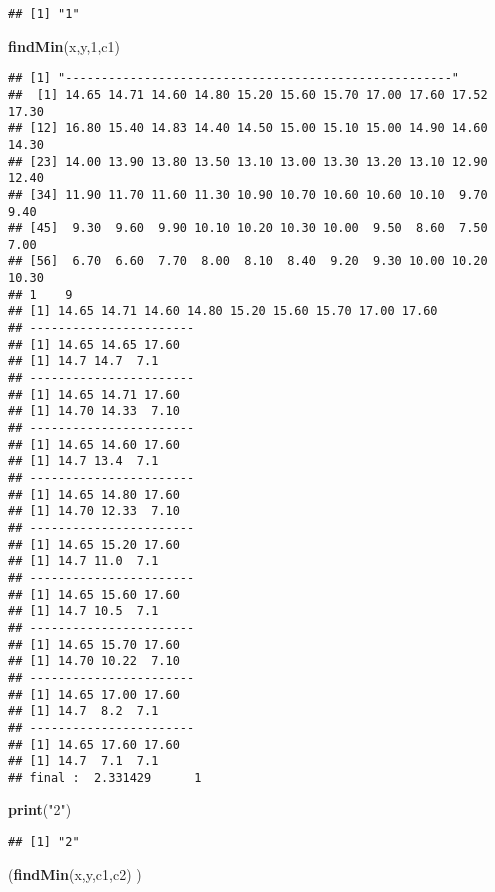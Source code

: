 \documentclass[]{article}
\newenvironment{Shaded}{\begin{snugshade}}{\end{snugshade}}
\newcommand{\KeywordTok}[1]{\textcolor[rgb]{0.13,0.29,0.53}{\textbf{#1}}}
\newcommand{\DecValTok}[1]{\textcolor[rgb]{0.00,0.00,0.81}{#1}}
\newcommand{\StringTok}[1]{\textcolor[rgb]{0.31,0.60,0.02}{#1}}
\newcommand{\NormalTok}[1]{#1}
\begin{document}
\begin{verbatim}
## [1] "1"
\end{verbatim}

\begin{Shaded}
\begin{Highlighting}[]
\KeywordTok{findMin}\NormalTok{(x,y,}\DecValTok{1}\NormalTok{,c1)}
\end{Highlighting}
\end{Shaded}

\begin{verbatim}
## [1] "------------------------------------------------------"
##  [1] 14.65 14.71 14.60 14.80 15.20 15.60 15.70 17.00 17.60 17.52 17.30
## [12] 16.80 15.40 14.83 14.40 14.50 15.00 15.10 15.00 14.90 14.60 14.30
## [23] 14.00 13.90 13.80 13.50 13.10 13.00 13.30 13.20 13.10 12.90 12.40
## [34] 11.90 11.70 11.60 11.30 10.90 10.70 10.60 10.60 10.10  9.70  9.40
## [45]  9.30  9.60  9.90 10.10 10.20 10.30 10.00  9.50  8.60  7.50  7.00
## [56]  6.70  6.60  7.70  8.00  8.10  8.40  9.20  9.30 10.00 10.20 10.30
## 1    9 
## [1] 14.65 14.71 14.60 14.80 15.20 15.60 15.70 17.00 17.60
## -----------------------
## [1] 14.65 14.65 17.60
## [1] 14.7 14.7  7.1
## -----------------------
## [1] 14.65 14.71 17.60
## [1] 14.70 14.33  7.10
## -----------------------
## [1] 14.65 14.60 17.60
## [1] 14.7 13.4  7.1
## -----------------------
## [1] 14.65 14.80 17.60
## [1] 14.70 12.33  7.10
## -----------------------
## [1] 14.65 15.20 17.60
## [1] 14.7 11.0  7.1
## -----------------------
## [1] 14.65 15.60 17.60
## [1] 14.7 10.5  7.1
## -----------------------
## [1] 14.65 15.70 17.60
## [1] 14.70 10.22  7.10
## -----------------------
## [1] 14.65 17.00 17.60
## [1] 14.7  8.2  7.1
## -----------------------
## [1] 14.65 17.60 17.60
## [1] 14.7  7.1  7.1
## final :  2.331429      1
\end{verbatim}

\begin{Shaded}
\begin{Highlighting}[]
\KeywordTok{print}\NormalTok{(}\StringTok{"2"}\NormalTok{)}
\end{Highlighting}
\end{Shaded}

\begin{verbatim}
## [1] "2"
\end{verbatim}

\begin{Shaded}
\begin{Highlighting}[]
\NormalTok{(}\KeywordTok{findMin}\NormalTok{(x,y,c1,c2) )}
\end{Highlighting}
\end{Shaded}
\end{document}
